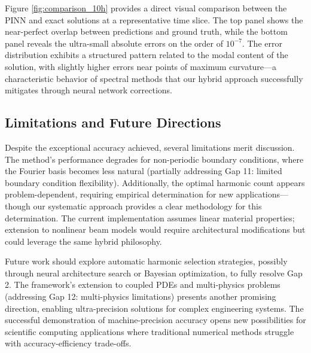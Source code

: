Figure \ref{fig:comparison_10h} provides a direct visual comparison between the PINN and exact solutions at a representative time slice. The top panel shows the near-perfect overlap between predictions and ground truth, while the bottom panel reveals the ultra-small absolute errors on the order of $10^{-7}$. The error distribution exhibits a structured pattern related to the modal content of the solution, with slightly higher errors near points of maximum curvature—a characteristic behavior of spectral methods that our hybrid approach successfully mitigates through neural network corrections.

\subsection{Limitations and Future Directions}

Despite the exceptional accuracy achieved, several limitations merit discussion. The method's performance degrades for non-periodic boundary conditions, where the Fourier basis becomes less natural (partially addressing Gap 11: limited boundary condition flexibility). Additionally, the optimal harmonic count appears problem-dependent, requiring empirical determination for new applications—though our systematic approach provides a clear methodology for this determination. The current implementation assumes linear material properties; extension to nonlinear beam models would require architectural modifications but could leverage the same hybrid philosophy.

Future work should explore automatic harmonic selection strategies, possibly through neural architecture search or Bayesian optimization, to fully resolve Gap 2. The framework's extension to coupled PDEs and multi-physics problems (addressing Gap 12: multi-physics limitations) presents another promising direction, enabling ultra-precision solutions for complex engineering systems. The successful demonstration of machine-precision accuracy opens new possibilities for scientific computing applications where traditional numerical methods struggle with accuracy-efficiency trade-offs.


